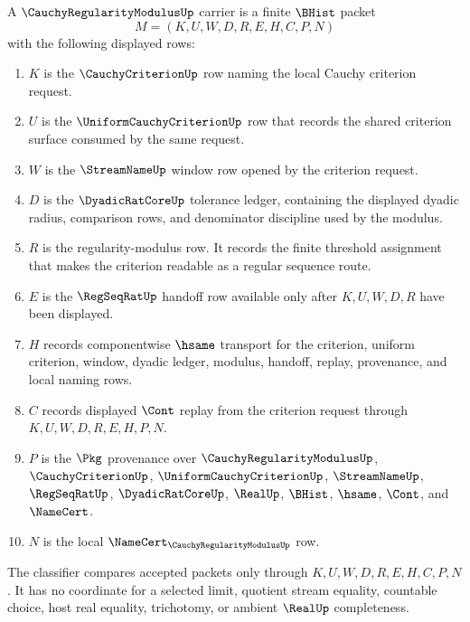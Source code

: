 \begin{definition}
\label{def:cauchy-regularity-modulus-carrier}
A $\CauchyRegularityModulusUp$ carrier is a finite $\BHist$ packet
$$
M=(K,U,W,D,R,E,H,C,P,N)
$$
with the following displayed rows:
\begin{enumerate}
\item $K$ is the $\CauchyCriterionUp$ row naming the local Cauchy criterion request.
\item $U$ is the $\UniformCauchyCriterionUp$ row that records the shared criterion surface consumed by the same request.
\item $W$ is the $\StreamNameUp$ window row opened by the criterion request.
\item $D$ is the $\DyadicRatCoreUp$ tolerance ledger, containing the displayed dyadic radius, comparison rows, and denominator discipline used by the modulus.
\item $R$ is the regularity-modulus row. It records the finite threshold assignment that makes the criterion readable as a regular sequence route.
\item $E$ is the $\RegSeqRatUp$ handoff row available only after $K,U,W,D,R$ have been displayed.
\item $H$ records componentwise $\hsame$ transport for the criterion, uniform criterion, window, dyadic ledger, modulus, handoff, replay, provenance, and local naming rows.
\item $C$ records displayed $\Cont$ replay from the criterion request through $K,U,W,D,R,E,H,P,N$.
\item $P$ is the $\Pkg$ provenance over $\CauchyRegularityModulusUp$, $\CauchyCriterionUp$, $\UniformCauchyCriterionUp$, $\StreamNameUp$, $\RegSeqRatUp$, $\DyadicRatCoreUp$, $\RealUp$, $\BHist$, $\hsame$, $\Cont$, and $\NameCert$.
\item $N$ is the local $\NameCert_{\CauchyRegularityModulusUp}$ row.
\end{enumerate}
The classifier compares accepted packets only through $K,U,W,D,R,E,H,C,P,N$. It has no coordinate for a selected limit, quotient stream equality, countable choice, host real equality, trichotomy, or ambient $\RealUp$ completeness.
\end{definition}


